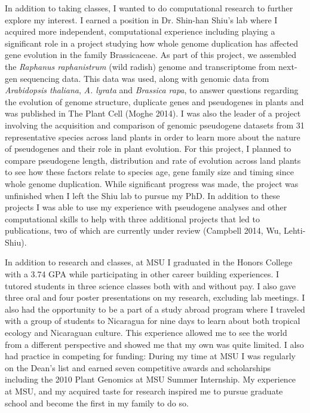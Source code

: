 \documentclass[12pt]{amsart}
\begin{document}
In addition to taking classes, I wanted to do computational research to further explore my interest.  
I earned a position in Dr. Shin-han Shiu's lab where I acquired more independent,  computational experience including playing a significant role in a project studying how whole genome duplication has affected gene evolution in the family Brassicaceae.  
As part of this project, we assembled the \textit{Raphanus raphanistrum} (wild radish) genome and transcriptome from next-gen sequencing data.  
This data was used, along with genomic data from \textit{Arabidopsis thaliana}, \textit{A. lyrata} and \textit{Brassica rapa}, to answer questions regarding the evolution of genome structure, duplicate genes and pseudogenes in plants and was published in The Plant Cell (Moghe 2014). 
I was also the leader of a project involving the acquisition and comparison of genomic pseudogene datasets from 31 representative species across land plants in order to learn more about the nature of pseudogenes and their role in plant evolution.  
For this project, I planned to compare pseudogene length, distribution and rate of evolution across land plants to see how these factors relate to species age, gene family size and timing since whole genome duplication.  
While significant progress was made, the project was unfinished when I left the Shiu lab to pursue my PhD.  
In addition to these projects I was able to use my experience with pseudogene analyses and other computational skills to help with three additional projects that led to publications, two of which are currently under review (Campbell 2014, Wu, Lehti-Shiu).

In addition to research and classes, at MSU I graduated in the Honors College with a 3.74 GPA while participating in other career building experiences.  
I tutored students in three science classes both with and without pay.
I also gave three oral and four poster presentations on my research, excluding lab meetings.
I also had the opportunity to be a part of a study abroad program where I traveled with a group of students to Nicaragua for nine days to learn about both tropical ecology and Nicaraguan culture. 
This experience allowed me to see the world from a different perspective and showed me that my own was quite limited.
I also had practice in competing for funding:
During my time at MSU I was regularly on the Dean's list and earned seven competitive awards and scholarships including the 2010 Plant Genomics at MSU Summer Internship. 
My experience at MSU, and my acquired taste for research inspired me to pursue graduate school and become the first in my family to do so.
\end{document}
